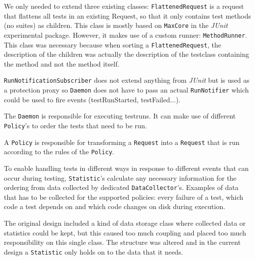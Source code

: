 \documentclass[i2]{oss}
\newcommand{\class}[1]{\texttt{#1}}
\newcommand{\junit}{\emph{JUnit }}
\begin{document}
We only needed to extend three existing classes: \class{FlattenedRequest}
is a request that flattens all tests in an existing Request, so that it only contains test methods (no suites) as children. 
This class is mostly based on \class{MaxCore} in the \junit experimental package. 
However, it makes use of a custom runner: \class{MethodRunner}. 
This class was necessary because when sorting a \class{FlattenedRequest}, the description of the children was actually the
description of the testclass containing the method and not the method 
itself.

\class{RunNotificationSubscriber} does not extend anything from 
\junit but is used as a protection proxy so \class{Daemon} does not have 
to pass an actual \class{RunNotifier} which could be used to fire events 
(testRunStarted, testFailed...). 

The \class{Daemon} is responsible for executing testruns.
It can make use of different \class{Policy}'s to order the tests that 
need to be run. 

A \class{Policy} is responsible for transforming a \class{Request} into a \class{Request} that is run according to the rules of the \class{Policy}. 

To enable handling tests in different ways in response to different 
events that can occur during testing, \class{Statistic}'s calculate any 
necessary information for the ordering from data collected by dedicated 
\class{DataCollector}'s.
Examples of data that has to be collected for the supported policies: 
every failure of a test, which code a test depends on and which code 
changes on disk during execution.

The original design included a kind of data storage class where collected
data or statistics could be kept, but this caused too much coupling
and placed too much responsibility on this single class.
The structure was altered and in the current design a \class{Statistic}
only holds on to the data that it needs.
\end{document}
